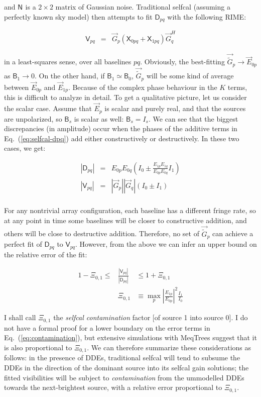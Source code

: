 \documentclass[referee]{aa}
\newcommand{\herm}{H}
\newcommand{\jones}[2]{\vec {#1}_{#2}}
\newcommand{\jonesT}[2]{\vec {#1}^{\herm}_{#2}}
\newcommand{\coh}[2]{\mathsf{{#1}}_{{#2}}}
\begin{document}
and $\coh{N}{}$ is a $2\times2$ matrix of Gaussian noise. Traditional selfcal (assuming a perfectly known sky model) then attempts to fit $\coh{D}{pq}$ with the following RIME:

\begin{eqnarray}\label{eq:selfcal-vpq}
\coh{V}{pq} & = & \jones{G}{p} ( \coh{X}{0pq} + \coh{X}{1pq} ) \jonesT{G}{q}
\end{eqnarray}

in a least-squares sense, over all baselines $pq$. Obviously, the best-fitting $\jones{\tilde G}{p}\to\jones{E}{0p}$ as $\coh{B}{1}\to0$. On the other hand, if $\coh{B}{1}\simeq\coh{B}{0}$, $\jones{\tilde G}{p}$ will be some kind of average between $\jones{E}{0p}$ and $\jones{E}{1p}$. Because of the complex phase behaviour in the $K$ terms, this is difficult to analyze in detail. To get a qualitative picture, let us consider the scalar case. Assume that $\jones{E}{p}$ is scalar and purely real, and that the sources are unpolarized, so $\coh{B}{s}$ is scalar as well: $\coh{B}{s}=I_s$. We can see that the biggest discrepancies (in amplitude) occur when the phases of the additive terms in Eq.~(\ref{eq:selfcal-dpq}) add either constructively or destructively. In these two cases, we get:

\begin{eqnarray*}
|\coh{D}{pq}| & = & E_{0p} E_{0q} ( I_0 \pm \frac{E_{1p} E_{1q}}{E_{0p} E_{0q}} I_1 ) \\
|\coh{V}{pq}| & = & |\jones{G}{p}| |\jones{G}{q}| ( I_0 \pm I_1 ) \\
\end{eqnarray*}

For any nontrivial array configuration, each baseline has a different fringe rate, so at any point in time some baselines will be closer to constructive addition, and others will be close to destructive addition. Therefore, no set of
$\jones{\tilde G}{p}$ can achieve a perfect fit of $\coh{D}{pq}$ to $\coh{V}{pq}$. However, from the above we can infer an upper bound on the relative error of the fit:

\begin{eqnarray}\label{eq:contamination}
1 -\Xi_{0,1} \le & { \displaystyle \frac{|\coh{V}{pq}|}{|\coh{D}{pq}|} } & \le 1 + \Xi_{0,1} \\
\nonumber & \Xi_{0,1} & \equiv \max_p \left| \frac{E_{1p}}{E_{0p}} \right|^2\frac{I_1}{I_0}
\end{eqnarray}

I shall call $\Xi_{0,1}$ the \emph{selfcal contamination} factor [of source 1 into source 0]. I do not have a formal proof for a lower boundary on the error terms in Eq.~(\ref{eq:contamination}), but extensive simulations with MeqTrees suggest that it is also proportional to $\Xi_{0,1}$. We can therefore summarize these considerations as follows: in the presence of DDEs, traditional selfcal will tend to subsume the DDEs in the direction of the dominant source into its selfcal gain solutions; the fitted visibilities will be subject to \emph{contamination} from the ummodelled DDEs towards the next-brightest source, with a relative error proportional to $\Xi_{0,1}$.
\end{document}
